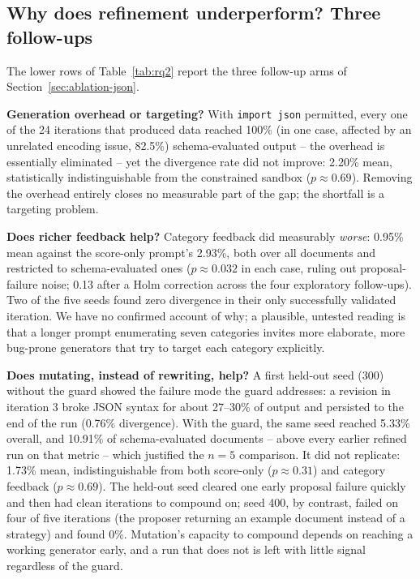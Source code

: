 \subsection{Why does refinement underperform? Three follow-ups}
\label{sec:evaluation-ablation}\label{sec:evaluation-category-feedback}\label{sec:evaluation-mutate-source}
The lower rows of Table~\ref{tab:rq2} report the three follow-up arms of
Section~\ref{sec:ablation-json}.

\textbf{Generation overhead or targeting?} With \texttt{import json}
permitted, every one of the 24 iterations that produced data reached 100\%
(in one case, affected by an unrelated encoding issue, 82.5\%)
schema-evaluated output -- the overhead is essentially eliminated -- yet
the divergence rate did not improve: 2.20\% mean, statistically
indistinguishable from the constrained sandbox ($p \approx 0.69$). Removing
the overhead entirely closes no measurable part of the gap; the shortfall
is a targeting problem.

\textbf{Does richer feedback help?} Category feedback did measurably
\emph{worse}: 0.95\% mean against the score-only prompt's 2.93\%, both over
all documents and restricted to schema-evaluated ones ($p \approx 0.032$ in
each case, ruling out proposal-failure noise; 0.13 after a Holm correction
across the four exploratory follow-ups). Two of the five seeds found
zero divergence in their only successfully validated iteration. We have no
confirmed account of why; a plausible, untested reading is that a longer
prompt enumerating seven categories invites more elaborate, more bug-prone
generators that try to target each category explicitly.

\textbf{Does mutating, instead of rewriting, help?} A first held-out seed
(300) without the guard showed the failure mode the guard addresses: a
revision in iteration 3 broke JSON syntax for about 27--30\% of output and
persisted to the end of the run (0.76\% divergence). With the guard, the same
seed reached 5.33\% overall, and 10.91\% of schema-evaluated documents --
above every earlier refined run on that metric -- which justified the
$n{=}5$ comparison.
It did not replicate: 1.73\% mean, indistinguishable from both score-only
($p \approx 0.31$) and category feedback ($p \approx 0.69$). The held-out
seed cleared one early proposal failure quickly and then had clean
iterations to compound on; seed 400, by contrast, failed on four of five
iterations (the proposer returning an example document instead of a
strategy) and found 0\%. Mutation's capacity to compound depends on reaching
a working generator early, and a run that does not is left with little
signal regardless of the guard.

